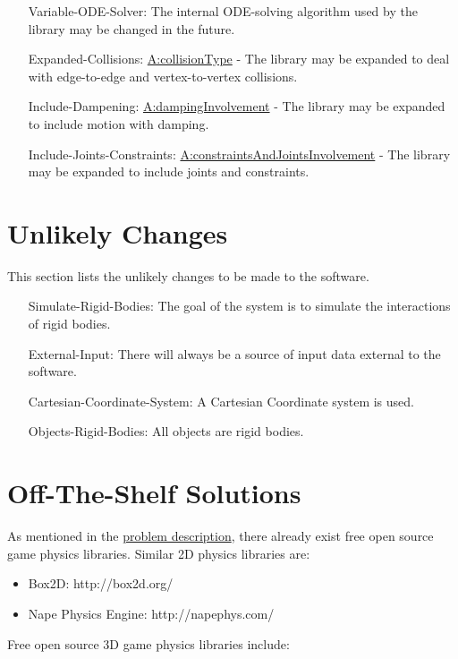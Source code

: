 \documentclass[12pt]{article}
\begin{document}
\begin{itemize}
\item[Variable-ODE-Solver:\phantomsection\label{lcVODES}]{The internal ODE-solving algorithm used by the library may be changed in the future.}
\item[Expanded-Collisions:\phantomsection\label{lcEC}]{\hyperref[assumpCT]{A:collisionType} - The library may be expanded to deal with edge-to-edge and vertex-to-vertex collisions.}
\item[Include-Dampening:\phantomsection\label{lcID}]{\hyperref[assumpDI]{A:dampingInvolvement} - The library may be expanded to include motion with damping.}
\item[Include-Joints-Constraints:\phantomsection\label{lcIJC}]{\hyperref[assumpCAJI]{A:constraintsAndJointsInvolvement} - The library may be expanded to include joints and constraints.}
\end{itemize}
\section{Unlikely Changes}
\label{Sec:UCs}
This section lists the unlikely changes to be made to the software.

\begin{itemize}
\item[Simulate-Rigid-Bodies:\phantomsection\label{ucSRB}]{The goal of the system is to simulate the interactions of rigid bodies.}
\item[External-Input:\phantomsection\label{ucEI}]{There will always be a source of input data external to the software.}
\item[Cartesian-Coordinate-System:\phantomsection\label{ucCCS}]{A Cartesian Coordinate system is used.}
\item[Objects-Rigid-Bodies:\phantomsection\label{ucORB}]{All objects are rigid bodies.}
\end{itemize}
\section{Off-The-Shelf Solutions}
\label{Sec:offShelfSolns}
As mentioned in the \hyperref[Sec:ProbDesc]{problem description}, there already exist free open source game physics libraries. Similar 2D physics libraries are:

\begin{itemize}
\item{Box2D: http://box2d.org/}
\item{Nape Physics Engine: http://napephys.com/}
\end{itemize}
Free open source 3D game physics libraries include:
\end{document}
